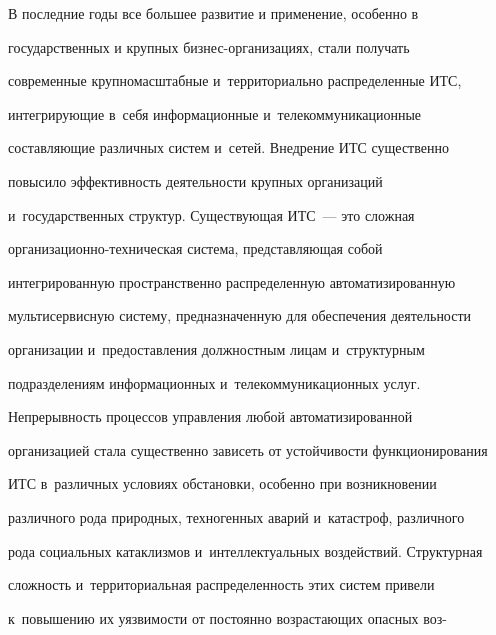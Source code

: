 \vspace*{-2pt}





  В последние годы все большее развитие и применение, особенно в


государственных и крупных биз\-нес-орга\-ни\-за\-ци\-ях, стали получать


современные крупномасштабные и~территориально распределенные ИТС,


интегрирующие в~себя информационные и~телекоммуникационные


составляющие различных систем и~сетей. Внедрение ИТС существенно


повысило эффективность деятельности крупных организаций


и~государственных структур. Существующая ИТС~--- это сложная


  ор\-га\-ни\-за\-ци\-он\-но-тех\-ни\-че\-ская система, представляющая собой


интегрированную пространственно распределенную автоматизированную


мультисервисную систему, предназначенную для обеспечения деятельности


организации и~предоставления должностным лицам и~структурным


подразделениям информационных и~телекоммуникационных услуг.


Непрерывность процессов управления любой автоматизированной


организацией стала существенно зависеть от устойчивости функционирования


ИТС в~различных условиях обстановки, особенно при возникновении


различного рода природных, техногенных аварий и~катастроф, различного


рода социальных катаклизмов и~интеллектуальных воздействий. Структурная


сложность и~территориальная распределенность этих систем привели


к~повышению их уязвимости от постоянно возрастающих опасных воз-\linebreak\vspace*{-12pt}





\pagebreak





\noindent


